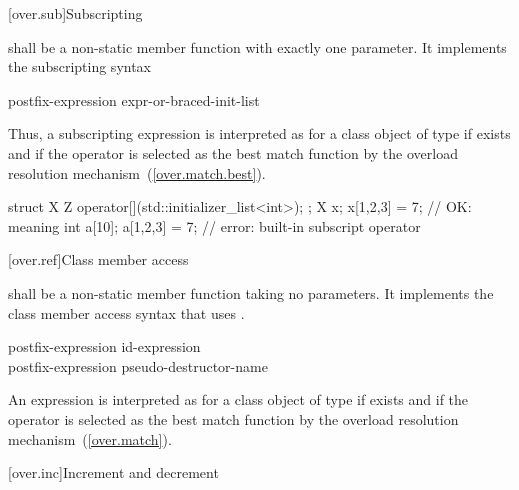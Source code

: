 [over.sub]{Subscripting}%
%

\pnum
{}
shall be a non-static member function with exactly one parameter.
It implements the subscripting syntax

\begin{ncsimplebnf}
postfix-expression \terminal{[} expr-or-braced-init-list \terminal{]}
\end{ncsimplebnf}

Thus, a subscripting expression
is interpreted as
for a class object
of type
if
exists and if the operator is selected as the best match function by
the overload resolution mechanism~(\ref{over.match.best}).
\begin{example}
\begin{codeblock}
struct X {
  Z operator[](std::initializer_list<int>);
};
X x;
x[{1,2,3}] = 7;           // OK: meaning 
int a[10];
a[{1,2,3}] = 7;           // error: built-in subscript operator
\end{codeblock}
\end{example}

[over.ref]{Class member access}
%

\pnum
{}
shall be a non-static member function taking no parameters.
It implements the class member access syntax that
uses \tcode{->}.

\begin{ncsimplebnf}
postfix-expression \terminal{->}  id-expression\\
postfix-expression \terminal{->} pseudo-destructor-name
\end{ncsimplebnf}

An expression
is interpreted as
for a class object
of type
if
exists and if the operator is selected as the best match function by
the overload resolution mechanism~(\ref{over.match}).

[over.inc]{Increment and decrement}
%
%
%
%

